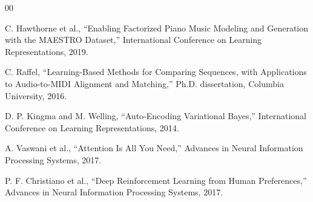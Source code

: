 \documentclass[conference]{IEEEtran}
\begin{document}
\begin{thebibliography}{00}

C. Hawthorne et al., ``Enabling Factorized Piano Music Modeling and Generation with the MAESTRO Dataset,'' International Conference on Learning Representations, 2019.

C. Raffel, ``Learning-Based Methods for Comparing Sequences, with Applications to Audio-to-MIDI Alignment and Matching,'' Ph.D. dissertation, Columbia University, 2016.

D. P. Kingma and M. Welling, ``Auto-Encoding Variational Bayes,'' International Conference on Learning Representations, 2014.

A. Vaswani et al., ``Attention Is All You Need,'' Advances in Neural Information Processing Systems, 2017.

P. F. Christiano et al., ``Deep Reinforcement Learning from Human Preferences,'' Advances in Neural Information Processing Systems, 2017.

\end{thebibliography}
\end{document}
